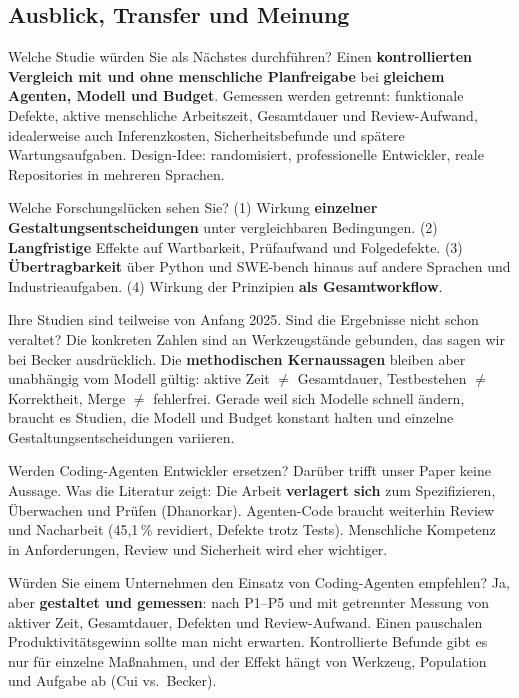 \documentclass[12pt,a4paper]{article}
\begin{document}
\subsection{Ausblick, Transfer und Meinung}

\begin{qa}{Welche Studie würden Sie als Nächstes durchführen?}
Einen \textbf{kontrollierten Vergleich mit und ohne menschliche Planfreigabe} bei \textbf{gleichem Agenten, Modell und Budget}. Gemessen werden getrennt: funktionale Defekte, aktive menschliche Arbeitszeit, Gesamtdauer und Review-Aufwand, idealerweise auch Inferenzkosten, Sicherheitsbefunde und spätere Wartungsaufgaben. Design-Idee: randomisiert, professionelle Entwickler, reale Repositories in mehreren Sprachen.
\end{qa}

\begin{qa}{Welche Forschungslücken sehen Sie?}
(1) Wirkung \textbf{einzelner Gestaltungsentscheidungen} unter vergleichbaren Bedingungen. (2) \textbf{Langfristige} Effekte auf Wartbarkeit, Prüfaufwand und Folgedefekte. (3) \textbf{Übertragbarkeit} über Python und SWE-bench hinaus auf andere Sprachen und Industrieaufgaben. (4) Wirkung der Prinzipien \textbf{als Gesamtworkflow}.
\end{qa}

\begin{qa}{Ihre Studien sind teilweise von Anfang 2025. Sind die Ergebnisse nicht schon veraltet?}
Die konkreten Zahlen sind an Werkzeugstände gebunden, das sagen wir bei Becker ausdrücklich. Die \textbf{methodischen Kernaussagen} bleiben aber unabhängig vom Modell gültig: aktive Zeit $\neq$ Gesamtdauer, Testbestehen $\neq$ Korrektheit, Merge $\neq$ fehlerfrei. Gerade weil sich Modelle schnell ändern, braucht es Studien, die Modell und Budget konstant halten und einzelne Gestaltungsentscheidungen variieren.
\end{qa}

\begin{qa}{Werden Coding-Agenten Entwickler ersetzen?}
Darüber trifft unser Paper keine Aussage. Was die Literatur zeigt: Die Arbeit \textbf{verlagert sich} zum Spezifizieren, Überwachen und Prüfen (Dhanorkar). Agenten-Code braucht weiterhin Review und Nacharbeit (45,1\,\% revidiert, Defekte trotz Tests). Menschliche Kompetenz in Anforderungen, Review und Sicherheit wird eher wichtiger.
\end{qa}

\begin{qa}{Würden Sie einem Unternehmen den Einsatz von Coding-Agenten empfehlen?}
Ja, aber \textbf{gestaltet und gemessen}: nach P1--P5 und mit getrennter Messung von aktiver Zeit, Gesamtdauer, Defekten und Review-Aufwand. Einen pauschalen Produktivitätsgewinn sollte man nicht erwarten. Kontrollierte Befunde gibt es nur für einzelne Maßnahmen, und der Effekt hängt von Werkzeug, Population und Aufgabe ab (Cui vs.\ Becker).
\end{qa}
\end{document}
